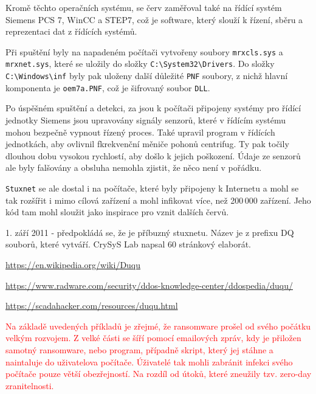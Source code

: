\documentclass[a4paper,12pt]{article}
\begin{document}
Kromě těchto operačních systému, se červ zaměřoval také na řídící systém Siemens PCS 7, WinCC a STEP7, což je software, který slouží k řízení, sběru a reprezentaci dat z řídících systémů\cite{stuxnet-nordvpn}.

Při spuštění byly na napadeném počítači vytvořeny soubory \texttt{mrxcls.sys} a \texttt{mrxnet.sys}, které se uložily do složky \texttt{C:\textbackslash System32\textbackslash Drivers}. Do složky \texttt{C:\textbackslash Windows\textbackslash inf} byly pak uloženy další důležité \texttt{PNF} soubory, z nichž hlavní komponenta je \texttt{oem7a.PNF}, což je šifrovaný soubor \texttt{DLL}.\cite{stuxnet-fsecure}

Po úspěšném spuštění a detekci, za jsou k počítači připojeny systémy pro řídící jednotky Siemens jsou upravovány signály senzorů, které v řídícím systému mohou bezpečně vypnout řízený proces. Také upravil program v řídících jednotkách, aby ovlivnil fkrekvenční měniče pohonů centrifug. Ty pak točily dlouhou dobu vysokou rychlostí, aby došlo k jejich poškození. Údaje ze senzorů ale byly falšovány a obsluha nemohla zjistit, že něco není v pořádku.\cite{stuxnet-nordvpn}\cite{stuxnet-avast}

\texttt{Stuxnet} se ale dostal i na počítače, které byly připojeny k Internetu a mohl se tak rozšířit i mimo cílová zařízení a mohl infikovat více, než 200\,000 zařízení\cite{stuxnet-zdnet}. Jeho kód tam mohl sloužit jako inspirace pro vznit dalších červů\cite{stuxnet-avast}.

1. září 2011 - předpokládá se, že je příbuzný stuxnetu. Název je z prefixu DQ souborů, které vytváří. CrySyS Lab napsal 60 stránkový elaborát.

\url{https://en.wikipedia.org/wiki/Duqu}

\url{https://www.radware.com/security/ddos-knowledge-center/ddospedia/duqu/}

\url{https://scadahacker.com/resources/duqu.html}




\textcolor{red}{Na základě uvedených příkladů je zřejmé, že ransomware prošel od svého počátku velkým rozvojem. Z velké části se šíří pomocí emailových zpráv, kdy je přiložen samotný ransomware, nebo program, případně skript, který jej stáhne a naintaluje do uživatelova počítače. Úživatelé tak mohli zabránit infekci svého počítače pouze větší obezřejností. Na rozdíl od útoků, které zneužily tzv. zero-day zranitelnosti.}
\end{document}
